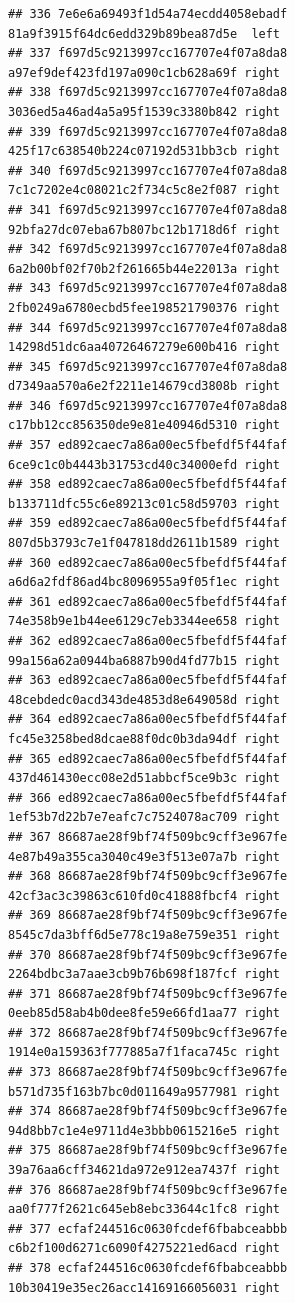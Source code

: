 \documentclass[]{article}
\begin{document}
\begin{verbatim}
## 336 7e6e6a69493f1d54a74ecdd4058ebadf 81a9f3915f64dc6edd329b89bea87d5e  left
## 337 f697d5c9213997cc167707e4f07a8da8 a97ef9def423fd197a090c1cb628a69f right
## 338 f697d5c9213997cc167707e4f07a8da8 3036ed5a46ad4a5a95f1539c3380b842 right
## 339 f697d5c9213997cc167707e4f07a8da8 425f17c638540b224c07192d531bb3cb right
## 340 f697d5c9213997cc167707e4f07a8da8 7c1c7202e4c08021c2f734c5c8e2f087 right
## 341 f697d5c9213997cc167707e4f07a8da8 92bfa27dc07eba67b807bc12b1718d6f right
## 342 f697d5c9213997cc167707e4f07a8da8 6a2b00bf02f70b2f261665b44e22013a right
## 343 f697d5c9213997cc167707e4f07a8da8 2fb0249a6780ecbd5fee198521790376 right
## 344 f697d5c9213997cc167707e4f07a8da8 14298d51dc6aa40726467279e600b416 right
## 345 f697d5c9213997cc167707e4f07a8da8 d7349aa570a6e2f2211e14679cd3808b right
## 346 f697d5c9213997cc167707e4f07a8da8 c17bb12cc856350de9e81e40946d5310 right
## 357 ed892caec7a86a00ec5fbefdf5f44faf 6ce9c1c0b4443b31753cd40c34000efd right
## 358 ed892caec7a86a00ec5fbefdf5f44faf b133711dfc55c6e89213c01c58d59703 right
## 359 ed892caec7a86a00ec5fbefdf5f44faf 807d5b3793c7e1f047818dd2611b1589 right
## 360 ed892caec7a86a00ec5fbefdf5f44faf a6d6a2fdf86ad4bc8096955a9f05f1ec right
## 361 ed892caec7a86a00ec5fbefdf5f44faf 74e358b9e1b44ee6129c7eb3344ee658 right
## 362 ed892caec7a86a00ec5fbefdf5f44faf 99a156a62a0944ba6887b90d4fd77b15 right
## 363 ed892caec7a86a00ec5fbefdf5f44faf 48cebdedc0acd343de4853d8e649058d right
## 364 ed892caec7a86a00ec5fbefdf5f44faf fc45e3258bed8dcae88f0dc0b3da94df right
## 365 ed892caec7a86a00ec5fbefdf5f44faf 437d461430ecc08e2d51abbcf5ce9b3c right
## 366 ed892caec7a86a00ec5fbefdf5f44faf 1ef53b7d22b7e7eafc7c7524078ac709 right
## 367 86687ae28f9bf74f509bc9cff3e967fe 4e87b49a355ca3040c49e3f513e07a7b right
## 368 86687ae28f9bf74f509bc9cff3e967fe 42cf3ac3c39863c610fd0c41888fbcf4 right
## 369 86687ae28f9bf74f509bc9cff3e967fe 8545c7da3bff6d5e778c19a8e759e351 right
## 370 86687ae28f9bf74f509bc9cff3e967fe 2264bdbc3a7aae3cb9b76b698f187fcf right
## 371 86687ae28f9bf74f509bc9cff3e967fe 0eeb85d58ab4b0dee8fe59e66fd1aa77 right
## 372 86687ae28f9bf74f509bc9cff3e967fe 1914e0a159363f777885a7f1faca745c right
## 373 86687ae28f9bf74f509bc9cff3e967fe b571d735f163b7bc0d011649a9577981 right
## 374 86687ae28f9bf74f509bc9cff3e967fe 94d8bb7c1e4e9711d4e3bbb0615216e5 right
## 375 86687ae28f9bf74f509bc9cff3e967fe 39a76aa6cff34621da972e912ea7437f right
## 376 86687ae28f9bf74f509bc9cff3e967fe aa0f777f2621c645eb8ebc33644c1fc8 right
## 377 ecfaf244516c0630fcdef6fbabceabbb c6b2f100d6271c6090f4275221ed6acd right
## 378 ecfaf244516c0630fcdef6fbabceabbb 10b30419e35ec26acc14169166056031 right

\end{verbatim}
\end{document}
